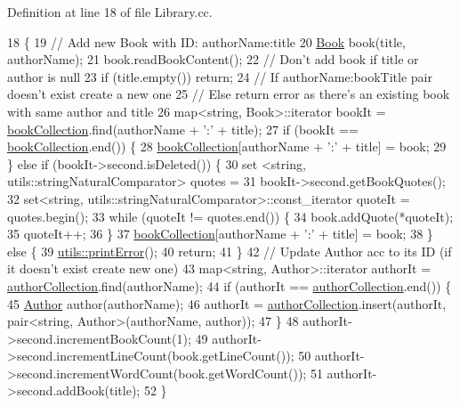 Definition at line 18 of file Library.\+cc.


\begin{DoxyCode}
18                                                       \{
19     \textcolor{comment}{// Add new Book with ID: authorName:title}
20     \hyperlink{class_book}{Book} book(title, authorName);
21     book.readBookContent();
22     \textcolor{comment}{// Don't add book if title or author is null}
23     \textcolor{keywordflow}{if} (title.empty()) \textcolor{keywordflow}{return};
24     \textcolor{comment}{// If authorName:bookTitle pair doesn't exist create a new one}
25     \textcolor{comment}{// Else return error as there's an existing book with same author and title}
26     map<string, Book>::iterator bookIt = \hyperlink{class_library_a5807d6d006ac0aa0a184831f0f2e5415}{bookCollection}.find(authorName + \textcolor{charliteral}{':'} + title);
27     \textcolor{keywordflow}{if} (bookIt == \hyperlink{class_library_a5807d6d006ac0aa0a184831f0f2e5415}{bookCollection}.end()) \{
28         \hyperlink{class_library_a5807d6d006ac0aa0a184831f0f2e5415}{bookCollection}[authorName + \textcolor{charliteral}{':'} + title] = book;
29     \} \textcolor{keywordflow}{else} \textcolor{keywordflow}{if} (bookIt->second.isDeleted()) \{
30         set <string, utils::stringNaturalComparator> quotes =
31                 bookIt->second.getBookQuotes();
32         set<string, utils::stringNaturalComparator>::const\_iterator quoteIt = quotes.begin();
33         \textcolor{keywordflow}{while} (quoteIt != quotes.end()) \{
34             book.addQuote(*quoteIt);
35             quoteIt++;
36         \}
37         \hyperlink{class_library_a5807d6d006ac0aa0a184831f0f2e5415}{bookCollection}[authorName + \textcolor{charliteral}{':'} + title] = book;
38     \} \textcolor{keywordflow}{else} \{
39         \hyperlink{namespaceutils_afd76dd21b41c50ce7396e30fb5d8d75b}{utils::printError}();
40         \textcolor{keywordflow}{return};
41     \}
42     \textcolor{comment}{// Update Author acc to its ID (if it doesn't exist create new one)}
43     map<string, Author>::iterator authorIt = \hyperlink{class_library_a7a6958a0dc85a1c816ca35727306cd62}{authorCollection}.find(authorName);
44     \textcolor{keywordflow}{if} (authorIt == \hyperlink{class_library_a7a6958a0dc85a1c816ca35727306cd62}{authorCollection}.end()) \{
45         \hyperlink{class_author}{Author} author(authorName);
46         authorIt = \hyperlink{class_library_a7a6958a0dc85a1c816ca35727306cd62}{authorCollection}.insert(authorIt, pair<string, Author>(authorName, 
      author));
47     \}
48     authorIt->second.incrementBookCount(1);
49     authorIt->second.incrementLineCount(book.getLineCount());
50     authorIt->second.incrementWordCount(book.getWordCount());
51     authorIt->second.addBook(title);
52 \}
\end{DoxyCode}
